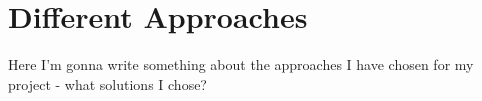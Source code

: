 \section{Different Approaches}

Here I'm gonna write something about the approaches I have chosen for my project - what solutions I chose?